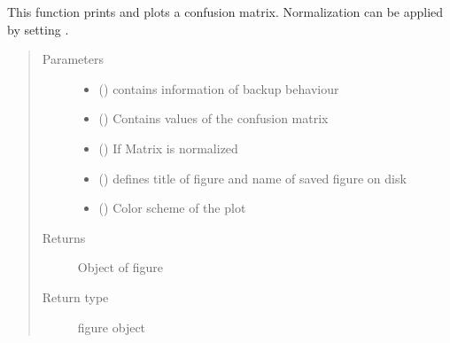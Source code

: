 \documentclass[letterpaper,10pt,english]{sphinxmanual}
\begin{document}
\begin{fulllineitems}
\label{\detokenize{SpikingConvNet:SpikingConvNet.utils.plot_confusion_matrix}}
This function prints and plots a confusion matrix.
Normalization can be applied by setting .
\begin{quote}\begin{description}
\item[{Parameters}] \leavevmode\begin{itemize}
\item {} 
 () \textendash{} contains information of backup behaviour

\item {} 
 () \textendash{} Contains values of the confusion matrix

\item {} 
 () \textendash{} If  Matrix is normalized

\item {} 
 () \textendash{} defines title of figure and name of saved figure on disk

\item {} 
 () \textendash{} Color scheme of the plot

\end{itemize}

\item[{Returns}] \leavevmode
{} \textendash{} Object of figure

\item[{Return type}] \leavevmode
figure object

\end{description}\end{quote}

\end{fulllineitems}

\end{document}

